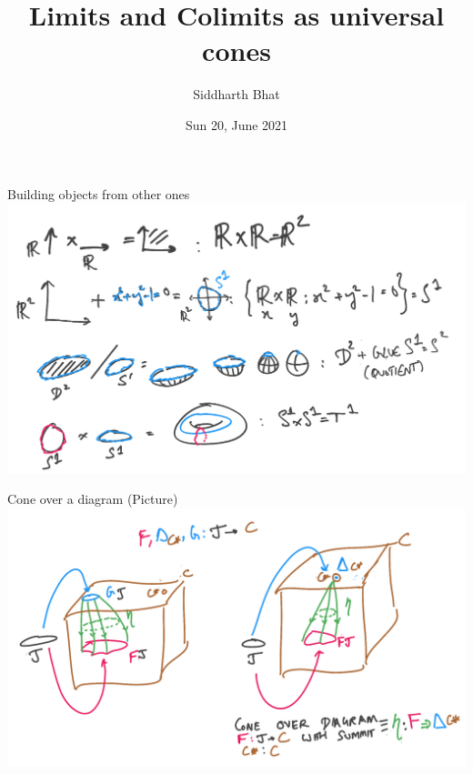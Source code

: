 \documentclass[8pt]{beamer}
\author{Siddharth Bhat}
\date{Sun 20, June 2021}
\institute{\texttt{\#\#harmless} Category Theory in Context}
\title{Limits and Colimits as universal cones}
\begin{document}
\maketitle

\begin{frame}[fragile]{Building objects from other ones}
    \includegraphics[width=\textwidth]{./examples.png}
\end{frame}

\begin{frame}[fragile]{Cone over a diagram (Picture)}
    \includegraphics[width=\textwidth]{./cone.png}
\end{frame}
\end{document}
